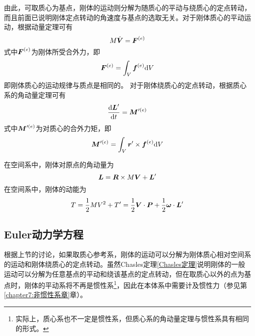 由此，可取质心为基点，刚体的运动则分解为随质心的平动与绕质心的定点转动，而且前面已说明刚体定点转动的角速度与基点的选取无关。对于刚体质心的平动运动，根据动量定理可有
\begin{equation}
	M \dot{\boldsymbol{V}} = \boldsymbol{F}^{(e)}
\end{equation}
式中$\boldsymbol{F}^{(e)}$为刚体所受合外力，即
\begin{equation*}
	\boldsymbol{F}^{(e)} = \int_V \boldsymbol{f}^{(e)} \mathrm{d} V
\end{equation*}
即刚体质心的运动规律与质点是相同的。
对于刚体绕质心的定点转动，根据质心系的角动量定理可有
\begin{equation}
	\frac{\mathrm{d} \boldsymbol{L}'}{\mathrm{d} t} = \boldsymbol{M}'^{(e)}
\end{equation}
式中$\boldsymbol{M}'^{(e)}$为对质心的合外力矩，即
\begin{equation*}
	\boldsymbol{M}'^{(e)} = \int_V \boldsymbol{r}' \times \boldsymbol{f}^{(e)} \mathrm{d} V
\end{equation*}

在空间系中，刚体对原点的角动量为
\begin{equation}
	\boldsymbol{L} = \boldsymbol{R} \times M \boldsymbol{V} + \boldsymbol{L}'
\end{equation}
在空间系中，刚体的动能为
\begin{equation}
	T = \frac12 MV^2 + T' = \frac12 \boldsymbol{V} \cdot \boldsymbol{P} + \frac12 \boldsymbol{\omega} \cdot \boldsymbol{L}'
\end{equation}

\subsection{Euler动力学方程}

根据上节的讨论，如果取质心参考系，刚体的运动可以分解为刚体质心相对空间系的运动和刚体绕质心的定点转动。虽然Chasles定理\ref{Chasles定理}说明刚体的一般运动可以分解为任意基点的平动和绕该基点的定点转动，但在取质心以外的点为基点时，刚体的平动系将不再是惯性系\footnote{实际上，质心系也不一定是惯性系，但质心系的角动量定理与惯性系具有相同的形式。}，因此在本体系中需要计及惯性力（参见第\ref{chapter7:非惯性系章}章）。

